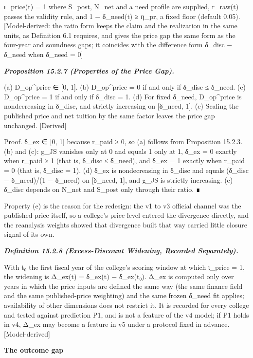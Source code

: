 \documentclass[
]{article}
\begin{document}
ι\_price(t) = 1 where S\_post, N\_net and a need profile are supplied,
r\_raw(t) passes the validity rule, and 1 − δ\_need(t) ≥ η\_pr, a fixed
floor (default 0.05). {[}Model-derived: the ratio form keeps the claim
and the realization in the same units, as Definition 6.1 requires, and
gives the price gap the same form as the four-year and soundness gaps;
it coincides with the difference form δ\_disc − δ\_need when δ\_need =
0{]}

\emph{\textbf{Proposition 15.2.7 (Properties of the Price Gap).}}

(a) D\_op\^{}price ∈ {[}0, 1{]}. (b) D\_op\^{}price = 0 if and only if
δ\_disc ≤ δ\_need. (c) D\_op\^{}price = 1 if and only if δ\_disc = 1.
(d) For fixed δ\_need, D\_op\^{}price is nondecreasing in δ\_disc, and
strictly increasing on {[}δ\_need, 1{]}. (e) Scaling the published price
and net tuition by the same factor leaves the price gap unchanged.
{[}Derived{]}

Proof. δ\_ex ∈ {[}0, 1{]} because r\_paid ≥ 0, so (a) follows from
Proposition 15.2.3. (b) and (c): g\_JS vanishes only at 0 and equals 1
only at 1, δ\_ex = 0 exactly when r\_paid ≥ 1 (that is, δ\_disc ≤
δ\_need), and δ\_ex = 1 exactly when r\_paid = 0 (that is, δ\_disc = 1).
(d) δ\_ex is nondecreasing in δ\_disc and equals (δ\_disc − δ\_need)/(1
− δ\_need) on {[}δ\_need, 1{]}, and g\_JS is strictly increasing. (e)
δ\_disc depends on N\_net and S\_post only through their ratio. ∎

Property (e) is the reason for the redesign: the v1 to v3 official
channel was the published price itself, so a college's price level
entered the divergence directly, and the reanalysis weights showed that
divergence built that way carried little closure signal of its own.

\emph{\textbf{Definition 15.2.8 (Excess-Discount Widening, Recorded
Separately).}}

With t₀ the first fiscal year of the college's scoring window at which
ι\_price = 1, the widening is Δ\_ex(t) = δ\_ex(t) − δ\_ex(t₀). Δ\_ex is
computed only over years in which the price inputs are defined the same
way (the same finance field and the same published-price weighting) and
the same frozen δ\_need fit applies; availability of other dimensions
does not restrict it. It is recorded for every college and tested
against prediction P1, and is not a feature of the v4 model; if P1 holds
in v4, Δ\_ex may become a feature in v5 under a protocol fixed in
advance. {[}Model-derived{]}

\textbf{The outcome gap}
\end{document}
